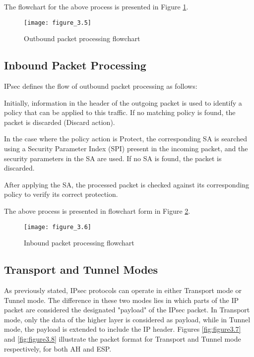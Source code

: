 The flowchart for the above process is presented in Figure \ref{fig:figure3.5}.

\begin{figure}
\centering
\texttt{[image: figure\_3.5]}\\
\caption{ Outbound packet processing flowchart}
\label{fig:figure3.5}
\end{figure}

\subsection{Inbound Packet Processing}

IPsec defines the flow of outbound packet processing as follows:
\begin{outline}

\1 Initially, information in the header of the outgoing packet is used to identify a policy that can be applied to this traffic. If no matching policy is found, the packet is discarded (Discard action).

\1 In the case where the policy action is Protect, the corresponding SA is searched using a Security Parameter Index (SPI) present in the incoming packet, and the security parameters in the SA are used. If no SA is found, the packet is discarded.

\1 After applying the SA, the processed packet is checked against its corresponding policy to verify its correct protection.
\end{outline}

The above process is presented in flowchart form in Figure \ref{fig:figure3.6}.

\begin{figure}
\centering
\texttt{[image: figure\_3.6]}\\
\caption{ Inbound packet processing flowchart}
\label{fig:figure3.6}
\end{figure}

\subsection{Transport and Tunnel Modes}
As previously stated, IPsec protocols can operate in either Transport mode or Tunnel mode. The difference in these two modes lies in which parts of the IP packet are considered the designated "payload" of the IPsec packet. In Transport mode,  only the data of the higher layer is considered as payload, while in Tunnel mode, the payload is extended to include the IP header. Figures \ref{fig:figure3.7} and \ref{fig:figure3.8} illustrate the packet format for Transport and Tunnel mode respectively, for both AH and ESP.


